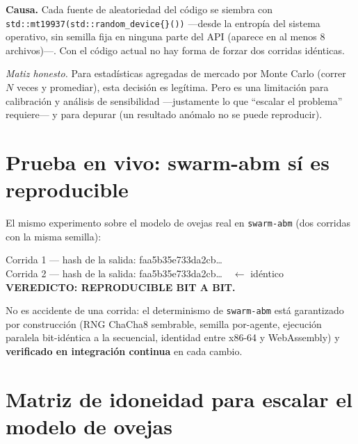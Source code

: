 \documentclass[11pt,a4paper]{article}
\newcommand{\code}[1]{\texttt{\small #1}}
\begin{document}
\noindent\textbf{Causa.} Cada fuente de aleatoriedad del código se siembra con
\code{std::mt19937(std::random\_device\{\}())} —desde la entropía del sistema
operativo, sin semilla fija en ninguna parte del API (aparece en al menos 8
archivos)—. Con el código actual no hay forma de forzar dos corridas idénticas.

\medskip
\noindent\textit{Matiz honesto.} Para estadísticas agregadas de mercado por Monte
Carlo (correr $N$ veces y promediar), esta decisión es legítima. Pero es una
limitación para calibración y análisis de sensibilidad —justamente lo que
``escalar el problema'' requiere— y para depurar (un resultado anómalo no se
puede reproducir).

\section{Prueba en vivo: swarm-abm sí es reproducible}

El mismo experimento sobre el modelo de ovejas real en \code{swarm-abm} (dos
corridas con la misma semilla):

\begin{tcolorbox}[colback=black!3,colframe=ln,boxrule=0.5pt,arc=2pt,fontupper=\ttfamily\small]
Corrida 1 — hash de la salida: \textcolor{acc}{faa5b35e733da2cb\dots} \\
Corrida 2 — hash de la salida: \textcolor{acc}{faa5b35e733da2cb\dots}\ \ $\leftarrow$ idéntico \\[4pt]
\textbf{VEREDICTO: REPRODUCIBLE BIT A BIT.}
\end{tcolorbox}

\noindent No es accidente de una corrida: el determinismo de \code{swarm-abm}
está garantizado por construcción (RNG ChaCha8 sembrable, semilla por-agente,
ejecución paralela bit-idéntica a la secuencial, identidad entre x86-64 y
WebAssembly) y \textbf{verificado en integración continua} en cada cambio.

\section{Matriz de idoneidad para escalar el modelo de ovejas}
\end{document}
